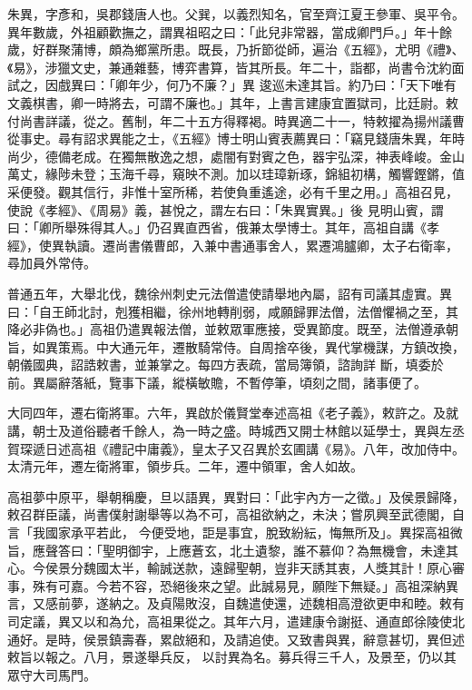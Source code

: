
\begin{pinyinscope}

 朱異，字彥和，吳郡錢唐人也。父巽，以義烈知名，官至齊江夏王參軍、吳平令。異年數歲，外祖顧歡撫之，謂異祖昭之曰：「此兒非常器，當成卿門戶。」年十餘歲，好群聚蒲博，頗為鄉黨所患。既長，乃折節從師，遍治《五經》，尤明《禮》、《易》，涉獵文史，兼通雜藝，博弈書算，皆其所長。年二十，詣都，尚書令沈約面試之，因戲異曰：「卿年少，何乃不廉？」異
 逡巡未達其旨。約乃曰：「天下唯有文義棋書，卿一時將去，可謂不廉也。」其年，上書言建康宜置獄司，比廷尉。敕付尚書詳議，從之。舊制，年二十五方得釋褐。時異適二十一，特敕擢為揚州議曹從事史。尋有詔求異能之士，《五經》博士明山賓表薦異曰：「竊見錢唐朱異，年時尚少，德備老成。在獨無散逸之想，處闇有對賓之色，器宇弘深，神表峰峻。金山萬丈，緣陟未登；玉海千尋，窺映不測。加以珪璋新琢，錦組初構，觸響鏗鏘，值采便發。觀其信行，非惟十室所稀，若使負重遙途，必有千里之用。」高祖召見，使說《孝經》、《周易》義，甚悅之，謂左右曰：「朱異實異。」後
 見明山賓，謂曰：「卿所舉殊得其人。」仍召異直西省，俄兼太學博士。其年，高祖自講《孝經》，使異執讀。遷尚書儀曹郎，入兼中書通事舍人，累遷鴻臚卿，太子右衛率，尋加員外常侍。



 普通五年，大舉北伐，魏徐州刺史元法僧遣使請舉地內屬，詔有司議其虛實。異曰：「自王師北討，剋獲相繼，徐州地轉削弱，咸願歸罪法僧，法僧懼禍之至，其降必非偽也。」高祖仍遣異報法僧，並敕眾軍應接，受異節度。既至，法僧遵承朝旨，如異策焉。中大通元年，遷散騎常侍。自周捨卒後，異代掌機謀，方鎮改換，朝儀國典，詔誥敕書，並兼掌之。每四方表疏，當局簿領，諮詢詳
 斷，填委於前。異屬辭落紙，覽事下議，縱橫敏贍，不暫停筆，頃刻之間，諸事便了。



 大同四年，遷右衛將軍。六年，異啟於儀賢堂奉述高祖《老子義》，敕許之。及就講，朝士及道俗聽者千餘人，為一時之盛。時城西又開士林館以延學士，異與左丞賀琛遞日述高祖《禮記中庸義》，皇太子又召異於玄圃講《易》。八年，改加侍中。太清元年，遷左衛將軍，領步兵。二年，遷中領軍，舍人如故。



 高祖夢中原平，舉朝稱慶，旦以語異，異對曰：「此宇內方一之徵。」及侯景歸降，敕召群臣議，尚書僕射謝舉等以為不可，高祖欲納之，未決；嘗夙興至武德閣，自言「我國家承平若此，
 今便受地，詎是事宜，脫致紛紜，悔無所及」。異探高祖微旨，應聲答曰：「聖明御宇，上應蒼玄，北土遺黎，誰不慕仰？為無機會，未達其心。今侯景分魏國太半，輸誠送款，遠歸聖朝，豈非天誘其衷，人獎其計！原心審事，殊有可嘉。今若不容，恐絕後來之望。此誠易見，願陛下無疑。」高祖深納異言，又感前夢，遂納之。及貞陽敗沒，自魏遣使還，述魏相高澄欲更申和睦。敕有司定議，異又以和為允，高祖果從之。其年六月，遣建康令謝挺、通直郎徐陵使北通好。是時，侯景鎮壽春，累啟絕和，及請追使。又致書與異，辭意甚切，異但述敕旨以報之。八月，景遂舉兵反，
 以討異為名。募兵得三千人，及景至，仍以其眾守大司馬門。




\end{pinyinscope}
